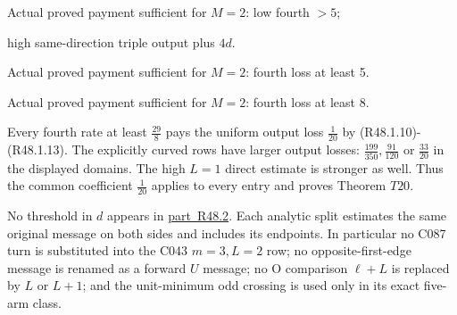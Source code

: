 \begin{description}[style=nextline,leftmargin=1.6em,before=\raggedright]
\item[{Five-arm class \((1,\allowbreak \allowbreak 2,\allowbreak \allowbreak c,\allowbreak \allowbreak b,\allowbreak \allowbreak e),\allowbreak \allowbreak c\ge 4\)}] Actual proved payment sufficient for \(M=2\): low fourth \(>5\);\par\noindent high same-direction triple output plus \(4d\).
\item[{Other five-arm unit-minimum odd classes}] Actual proved payment sufficient for \(M=2\): fourth loss at least 5.
\item[{Unit-minimum odd, \(r_1=2,\allowbreak \allowbreak j\ge 3\)}] Actual proved payment sufficient for \(M=2\): fourth loss at least 8.
\end{description}

Every fourth rate at least \(\frac{29}{8}\) pays the uniform output loss \(\frac{1}{20}\) by (R48.1.10)-(R48.1.13). The explicitly curved rows have larger output losses: \(\frac{199}{350},\allowbreak \allowbreak  \frac{91}{120}\) or \(\frac{33}{20}\) in the displayed domains. The high \(L=1\) direct estimate is stronger as well. Thus the common coefficient \(\frac{1}{20}\) applies to every entry and proves Theorem \(T20\).

No threshold in \(d\) appears in \mbox{\hyperref[part:R48.2]{part R48.2}}. Each analytic split estimates the same original message on both sides and includes its endpoints. In particular no C087 turn is substituted into the C043 \(m=3,\allowbreak \allowbreak L=2\) row; no opposite-first-edge message is renamed as a forward \(U\) message; no O comparison \(\ell+L\) is replaced by \(L\) or \(L+1\); and the unit-minimum odd crossing is used only in its exact five-arm class.

